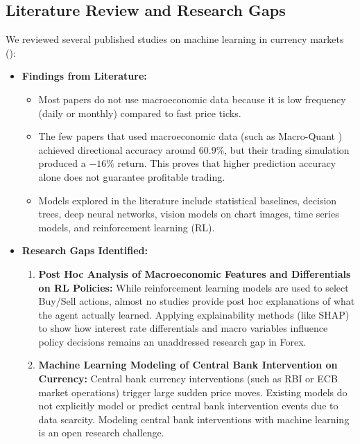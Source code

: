 \subsection{Literature Review and Research Gaps}
We reviewed several published studies on machine learning in currency markets (\cite{forexTrend2011, deepTechnicalAnalysis2021, financialTradingGame2018, macroQuant2025, deepLstmRl2019, algoMl2022}):
\begin{itemize}[leftmargin=1.5cm, itemsep=1pt]
	\item \textbf{Findings from Literature:}
	\begin{itemize}
		\item Most papers do not use macroeconomic data because it is low frequency (daily or monthly) compared to fast price ticks.
		\item The few papers that used macroeconomic data (such as Macro-Quant \cite{macroQuant2025}) achieved directional accuracy around $60.9\%$, but their trading simulation produced a $-16\%$ return. This proves that higher prediction accuracy alone does not guarantee profitable trading.
		\item Models explored in the literature include statistical baselines, decision trees, deep neural networks, vision models on chart images, time series models, and reinforcement learning (RL).
	\end{itemize}
	\item \textbf{Research Gaps Identified:}
	\begin{enumerate}[leftmargin=1.0cm, itemsep=2pt]
		\item \textbf{Post Hoc Analysis of Macroeconomic Features and Differentials on RL Policies:}
		While reinforcement learning models are used to select Buy/Sell actions, almost no studies provide post hoc explanations of what the agent actually learned. Applying explainability methods (like SHAP) to show how interest rate differentials and macro variables influence policy decisions remains an unaddressed research gap in Forex.
		\item \textbf{Machine Learning Modeling of Central Bank Intervention on Currency:}
		Central bank currency interventions (such as RBI or ECB market operations) trigger large sudden price moves. Existing models do not explicitly model or predict central bank intervention events due to data scarcity. Modeling central bank interventions with machine learning is an open research challenge.
	\end{enumerate}
\end{itemize}

